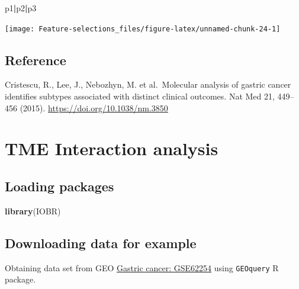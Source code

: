 \documentclass[
  12pt,
]{book}
\newenvironment{Shaded}{\begin{snugshade}}{\end{snugshade}}
\newcommand{\FunctionTok}[1]{\textcolor[rgb]{0.13,0.29,0.53}{\textbf{#1}}}
\newcommand{\NormalTok}[1]{#1}
\newcommand{\SpecialCharTok}[1]{\textcolor[rgb]{0.81,0.36,0.00}{\textbf{#1}}}
\begin{document}
\begin{Shaded}
\begin{Highlighting}[]
\NormalTok{p1}\SpecialCharTok{|}\NormalTok{p2}\SpecialCharTok{|}\NormalTok{p3}
\end{Highlighting}
\end{Shaded}

\begin{center}\texttt{[image: Feature-selections\_files/figure-latex/unnamed-chunk-24-1]} \end{center}

\hypertarget{reference}{%
\section{Reference}\label{reference}}

Cristescu, R., Lee, J., Nebozhyn, M. et al.~Molecular analysis of gastric cancer identifies subtypes associated with distinct clinical outcomes. Nat Med 21, 449--456 (2015). \url{https://doi.org/10.1038/nm.3850}

\hypertarget{tme-interaction-analysis}{%
\chapter{\texorpdfstring{\textbf{TME Interaction analysis}}{TME Interaction analysis}}\label{tme-interaction-analysis}}

\hypertarget{loading-packages-4}{%
\section{Loading packages}\label{loading-packages-4}}

\begin{Shaded}
\begin{Highlighting}[]
\FunctionTok{library}\NormalTok{(IOBR)}
\end{Highlighting}
\end{Shaded}

\hypertarget{downloading-data-for-example-3}{%
\section{Downloading data for example}\label{downloading-data-for-example-3}}

Obtaining data set from GEO \href{https://pubmed.ncbi.nlm.nih.gov/25894828/}{Gastric cancer: GSE62254} using \texttt{GEOquery} R package.
\end{document}
